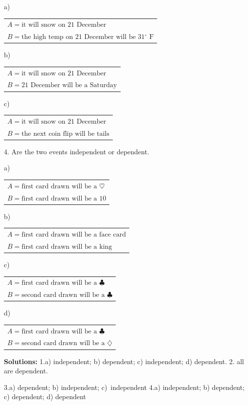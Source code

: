 \documentclass[10pt]{article}
\begin{document}
\hspace{20pt} a)
\begin{tabular}{l}
$A=\mbox{it will snow on 21 December}$\\[2pt]
$B=\mbox{the high temp on 21 December will be 31$^\circ$ F}$\\
\end{tabular}
\medskip

\hspace{20pt} b) 
\begin{tabular}{l}
$A=\mbox{it will snow on 21 December}$\\[2pt]
$B=\mbox{21 December will be a Saturday}$\\
\end{tabular}
\medskip

\hspace{20pt} c)
\begin{tabular}{l}
$A=\mbox{it will snow on 21 December}$\\[2pt]
$B=\mbox{the next coin flip will be tails}$\\
\end{tabular}
\medskip

4. Are the two events independent or dependent.

\hspace{20pt} a)
\begin{tabular}{l}
$A=\mbox{first card drawn will be a $\heartsuit$}$\\[2pt]
$B=\mbox{first card drawn will be a 10}$\\
\end{tabular}
\medskip

\hspace{20pt} b)
\begin{tabular}{l}
$A=\mbox{first card drawn will be a face card}$\\[2pt]
$B=\mbox{first card drawn will be a king}$\\
\end{tabular}
\medskip

\hspace{20pt} c)
\begin{tabular}{l}
$A=\mbox{first card drawn will be a $\clubsuit$}$\\[2pt]
$B=\mbox{second card drawn will be a $\clubsuit$}$\\
\end{tabular}
\medskip

\hspace{20pt} d)
\begin{tabular}{l}
$A=\mbox{first card drawn will be a $\clubsuit$}$\\[2pt]
$B=\mbox{second card drawn will be a $\diamondsuit$}$\\
\end{tabular}
\medskip


{\scriptsize \textbf{Solutions:} 1.a) independent; b) dependent; c) independent; d) dependent.\hspace{10pt}
2. all are dependent.\vspace{-5pt}

3.a) dependent; b) independent; c)~independent\hspace{10pt}
4.a) independent; b) dependent; c) dependent; d) dependent}
\eject
\end{document}
